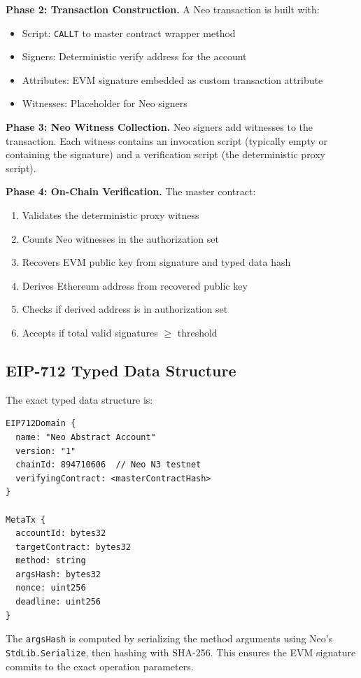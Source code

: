 \documentclass[10pt,twocolumn]{article}
\newcommand{\code}[1]{\texttt{\small #1}}
\begin{document}
\textbf{Phase 2: Transaction Construction.} A Neo transaction is built with:
\begin{itemize}[leftmargin=*,topsep=2pt,itemsep=1pt]
\item Script: \code{CALLT} to master contract wrapper method
\item Signers: Deterministic verify address for the account
\item Attributes: EVM signature embedded as custom transaction attribute
\item Witnesses: Placeholder for Neo signers
\end{itemize}

\textbf{Phase 3: Neo Witness Collection.} Neo signers add witnesses to the transaction. Each witness contains an invocation script (typically empty or containing the signature) and a verification script (the deterministic proxy script).

\textbf{Phase 4: On-Chain Verification.} The master contract:
\begin{enumerate}[leftmargin=*,topsep=2pt,itemsep=1pt]
\item Validates the deterministic proxy witness
\item Counts Neo witnesses in the authorization set
\item Recovers EVM public key from signature and typed data hash
\item Derives Ethereum address from recovered public key
\item Checks if derived address is in authorization set
\item Accepts if total valid signatures $\geq$ threshold
\end{enumerate}

\subsection{EIP-712 Typed Data Structure}

The exact typed data structure is:

\begin{verbatim}
EIP712Domain {
  name: "Neo Abstract Account"
  version: "1"
  chainId: 894710606  // Neo N3 testnet
  verifyingContract: <masterContractHash>
}

MetaTx {
  accountId: bytes32
  targetContract: bytes32
  method: string
  argsHash: bytes32
  nonce: uint256
  deadline: uint256
}
\end{verbatim}

The \code{argsHash} is computed by serializing the method arguments using Neo's \code{StdLib.Serialize}, then hashing with SHA-256. This ensures the EVM signature commits to the exact operation parameters.
\end{document}
